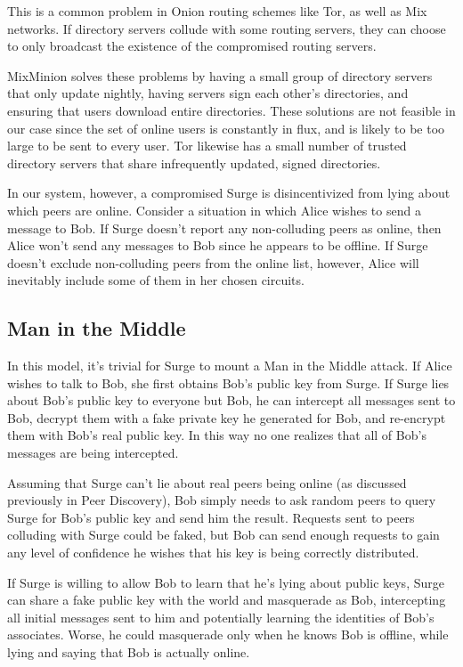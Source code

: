 \documentclass[twocolumn,11pt,english]{article}
\begin{document}
This is a common problem in Onion routing schemes like Tor, as well as Mix networks. If directory servers collude with some routing servers, they can choose to only broadcast the existence of the compromised routing servers.

MixMinion \cite{minion-design} solves these problems by having a small group of directory servers that only update nightly, having servers sign each other's directories, and ensuring that users download entire directories. These solutions are not feasible in our case since the set of online users is constantly in flux, and is likely to be too large to be sent to every user. Tor \cite{tor-design} likewise has a small number of trusted directory servers that share infrequently updated, signed directories.

In our system, however, a compromised Surge is disincentivized from lying about which peers are online. Consider a situation in which Alice wishes to send a message to Bob. If Surge doesn't report any non-colluding peers as online, then Alice won't send any messages to Bob since he appears to be offline. If Surge doesn't exclude non-colluding peers from the online list, however, Alice will inevitably include some of them in her chosen circuits. 


\subsection{Man in the Middle} 

In this model, it's trivial for Surge to mount a Man in the Middle attack. If Alice wishes to talk to Bob, she first obtains Bob's public key from Surge. If Surge lies about Bob's public key to everyone but Bob, he can intercept all messages sent to Bob, decrypt them with a fake private key he generated for Bob, and re-encrypt them with Bob's real public key. In this way no one realizes that all of Bob's messages are being intercepted. 

 Assuming that Surge can't lie about real peers being online (as discussed previously in Peer Discovery), Bob simply needs to ask random peers to query Surge for Bob's public key and send him the result. Requests sent to peers colluding with Surge could be faked, but Bob can send enough requests to gain any level of confidence he wishes that his key is being correctly distributed. 

If Surge is willing to allow Bob to learn that he's lying about public keys, Surge can share a fake public key with the world and masquerade as Bob, intercepting all initial messages sent to him and potentially learning the identities of Bob's associates. Worse, he could masquerade only when he knows Bob is offline, while lying and saying that Bob is actually online.
\end{document}
